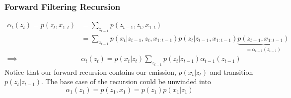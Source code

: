 \documentclass[11pt]{article}
\newcommand{\bx}{\mathbf{x}}
\begin{document}
\subsubsection{Forward Filtering Recursion}
\begin{align}
    \alpha_t(z_t) = p\left(z_{t}, x_{1: t}\right)
    &=\sum_{z_{t-1}} p\left(z_{t-1}, z_{t}, x_{1: t}\right) \\
    &= \sum_{z_{t-1}} p\left(x_{t} | z_{t-1}, z_{t}, x_{1: t-1}\right) p\left(z_{t} | z_{t-1}, x_{1: t-1}\right) \underbrace{p\left(z_{t-1}, x_{1: t-1}\right)}_{ = \alpha_{t - 1}(z_{t - 1})}\\
    \implies &\alpha_{t}\left(z_{t}\right)=p\left(x_{t} | z_{t}\right) \sum_{z_{t-1}} p\left(z_{t} | z_{t-1}\right) \alpha_{t-1}\left(z_{t-1}\right)
\end{align}
Notice that our forward recursion contains our emission, $p(x_t | z_t)$ and transition $p(z_t | z_{t - 1})$. The base case of the recursion could be unwinded into
\begin{equation}
    \alpha_{1}\left(z_{1}\right)=p\left(z_{1}, x_{1}\right)=p\left(z_{1}\right) p\left(x_{1} | z_{1}\right)
\end{equation}
\end{document}
